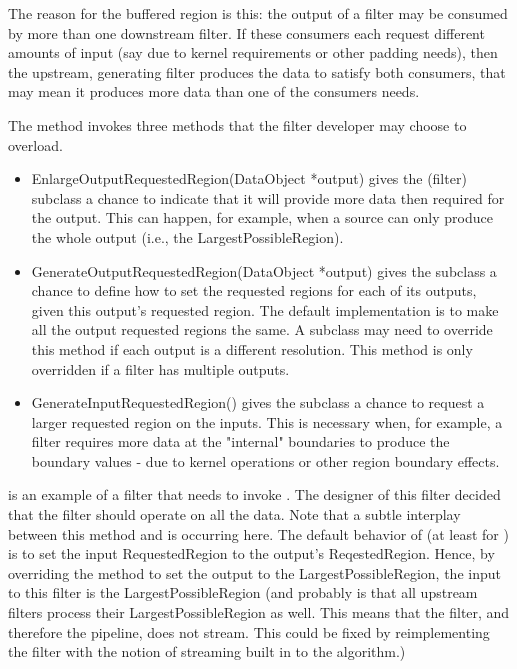 The reason for the buffered region is this: the output of a filter may be
consumed by more than one downstream filter. If these consumers each request
different amounts of input (say due to kernel requirements or other padding
needs), then the upstream, generating filter produces the data to satisfy
both consumers, that may mean it produces more data than one of the
consumers needs.

The  method invokes three methods
that the filter developer may choose to overload. 

\begin{itemize}
        \item EnlargeOutputRequestedRegion(DataObject *output) gives the
        (filter) subclass a chance to indicate that it will provide more data
        then required for the output. This can happen, for example, when a
        source can only produce the whole output (i.e., the
        LargestPossibleRegion).

        \item GenerateOutputRequestedRegion(DataObject *output) gives the
        subclass a chance to define how to set the requested regions for each
        of its outputs, given this output's requested region.  The default
        implementation is to make all the output requested regions the same.
        A subclass may need to override this method if each output is a
        different resolution. This method is only overridden if a filter has
        multiple outputs.

        \item GenerateInputRequestedRegion() gives the subclass a chance to
        request a larger requested region on the inputs. This is necessary
        when, for example, a filter requires more data at the "internal"
        boundaries to produce the boundary values - due to kernel operations
        or other region boundary effects.
\end{itemize}

 is an example of a filter that needs to invoke
. The designer of this filter decided that
the filter should operate on all the data. Note that a subtle interplay between
this method and  is occurring here. The
default behavior of  (at least for
) is to set the input RequestedRegion to the output's
ReqestedRegion. Hence, by overriding the method
 to set the output to the
LargestPossibleRegion, the input to this filter is the LargestPossibleRegion
(and probably is that all upstream filters process their LargestPossibleRegion
as well. This means that the filter, and therefore the pipeline, does not
stream. This could be fixed by reimplementing the filter with the notion of
streaming built in to the algorithm.)

